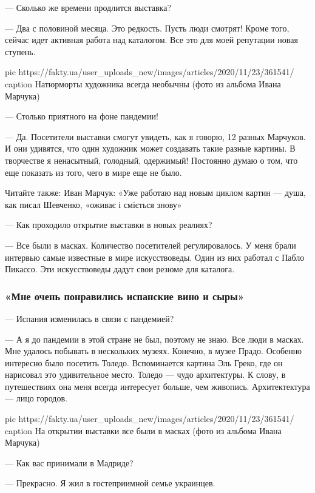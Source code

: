 --- Сколько же времени продлится выставка?

--- Два с половиной месяца. Это редкость. Пусть люди смотрят! Кроме того,
сейчас идет активная работа над каталогом. Все это для моей репутации
новая ступень.

\ifcmt
pic https://fakty.ua/user_uploads_new/images/articles/2020/11/23/361541/%
caption Натюрморты художника всегда необычны (фото из альбома Ивана Марчука)
\fi


--- Столько приятного на фоне пандемии!

--- Да. Посетители выставки смогут увидеть, как я говорю, 12 разных
Марчуков. И они удивятся, что один художник может создавать такие разные
картины. В творчестве я ненасытный, голодный, одержимый! Постоянно думаю
о том, что еще показать из того, чего в мире еще не было.

Читайте также: Иван Марчук: «Уже работаю над новым циклом картин --- душа,
как писал Шевченко, «оживає і сміється знову»

--- Как проходило открытие выставки в новых реалиях?

--- Все были в масках. Количество посетителей регулировалось. У меня брали
интервью самые известные в мире искусствоведы. Один из них работал с Пабло
Пикассо. Эти искусствоведы дадут свои резюме для каталога.

\subsubsection{«Мне очень понравились испанские вино и сыры»}

--- Испания изменилась в связи с пандемией?

--- А я до пандемии в этой стране не был, поэтому не знаю. Все люди
в масках. Мне удалось побывать в нескольких музеях. Конечно, в музее
Прадо. Особенно интересно было посетить Толедо. Вспоминается картина Эль
Греко, где он нарисовал это удивительное место. Толедо --- чудо архитектуры.
К слову, в путешествиях она меня всегда интересует больше, чем живопись.
Архитектектура --- лицо городов.

\ifcmt
pic https://fakty.ua/user_uploads_new/images/articles/2020/11/23/361541/%
caption На открытии выставки все были в масках (фото из альбома Ивана Марчука)
\fi


--- Как вас принимали в Мадриде?

--- Прекрасно. Я жил в гостеприимной семье украинцев.

